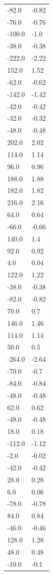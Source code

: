 \begin{longtable}{ll}
-82.0 & -0.82 \\
-76.0 & -0.76 \\
-100.0 & -1.0 \\
-38.0 & -0.38 \\
-222.0 & -2.22 \\
152.0 & 1.52 \\
-62.0 & -0.62 \\
-142.0 & -1.42 \\
-42.0 & -0.42 \\
-32.0 & -0.32 \\
-48.0 & -0.48 \\
202.0 & 2.02 \\
114.0 & 1.14 \\
96.0 & 0.96 \\
188.0 & 1.88 \\
182.0 & 1.82 \\
216.0 & 2.16 \\
64.0 & 0.64 \\
-66.0 & -0.66 \\
140.0 & 1.4 \\
92.0 & 0.92 \\
4.0 & 0.04 \\
122.0 & 1.22 \\
-38.0 & -0.38 \\
-82.0 & -0.82 \\
70.0 & 0.7 \\
146.0 & 1.46 \\
114.0 & 1.14 \\
50.0 & 0.5 \\
-264.0 & -2.64 \\
-70.0 & -0.7 \\
-84.0 & -0.84 \\
-48.0 & -0.48 \\
62.0 & 0.62 \\
-48.0 & -0.48 \\
18.0 & 0.18 \\
-112.0 & -1.12 \\
-2.0 & -0.02 \\
-42.0 & -0.42 \\
28.0 & 0.28 \\
6.0 & 0.06 \\
-78.0 & -0.78 \\
84.0 & 0.84 \\
-46.0 & -0.46 \\
128.0 & 1.28 \\
48.0 & 0.48 \\
-10.0 & -0.1 \\

\end{longtable}
